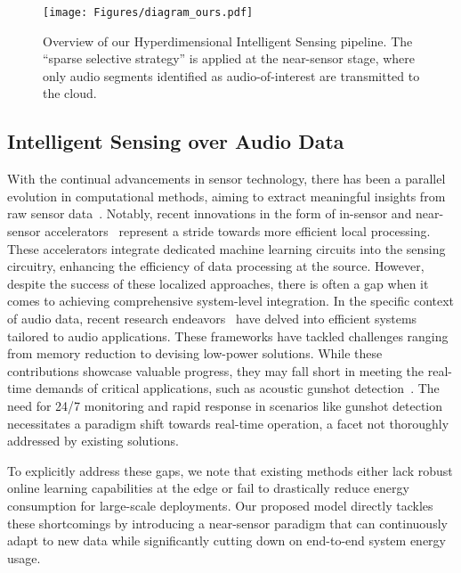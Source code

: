 
\begin{figure*}
  \centering
  \texttt{[image: Figures/diagram\_ours.pdf]}
  \caption{Overview of our Hyperdimensional Intelligent Sensing pipeline. The  ``sparse selective strategy'' is applied at the near-sensor stage, where only audio segments identified as audio-of-interest are transmitted to the cloud.}
  \label{Fig:overview_diagram_ours}
\end{figure*}

\subsection{Intelligent Sensing over Audio Data} 
With the continual advancements in sensor technology, there has been a parallel evolution in computational methods, aiming to extract meaningful insights from raw sensor data~\cite{ballard2021machine}. Notably, recent innovations in the form of in-sensor and near-sensor accelerators~\cite{li2021recent,angizi2022pisa,ma2022hogeye, sumbul2022system,zhou2020near, yun2024hypersense} represent a stride towards more efficient local processing. These accelerators integrate dedicated machine learning circuits into the sensing circuitry, enhancing the efficiency of data processing at the source. However, despite the success of these localized approaches, there is often a gap when it comes to achieving comprehensive system-level integration. In the specific context of audio data, recent research endeavors~\cite{Vajpayee_2023_WACV,10005289,10059143} have delved into efficient systems tailored to audio applications. These frameworks have tackled challenges ranging from memory reduction to devising low-power solutions. While these contributions showcase valuable progress, they may fall short in meeting the real-time demands of critical applications, such as acoustic gunshot detection~\cite{hansen2021gunshot}. The need for 24/7 monitoring and rapid response in scenarios like gunshot detection necessitates a paradigm shift towards real-time operation, a facet not thoroughly addressed by existing solutions.

To explicitly address these gaps, we note that existing methods either lack robust online learning capabilities at the edge or fail to drastically reduce energy consumption for large-scale deployments. Our proposed model directly tackles these shortcomings by introducing a near-sensor paradigm that can continuously adapt to new data while significantly cutting down on end-to-end system energy usage.

